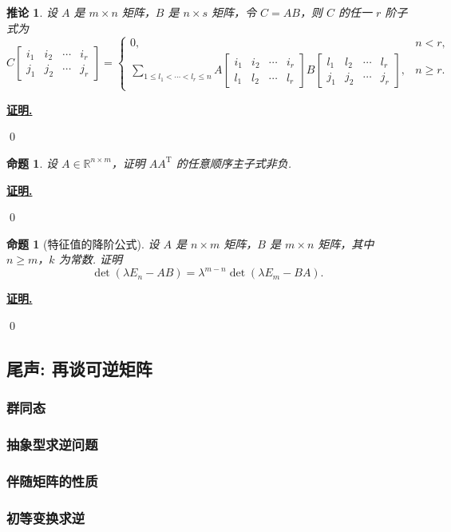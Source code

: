 \documentclass[10pt,openany]{article}
\theoremstyle{thmstyle} %
\theoremstyle{defstyle} %
\newtheorem{corollary}[theorem]{推论}
\theoremstyle{prostyle} %
\newtheorem{proposition}[theorem]{命题}
\theoremstyle{exastyle}
\theoremstyle{remstyle}
\renewenvironment{proof}[1][证明]{\par\underline{\textbf{#1.}} \;\fangsong}{\qed\par}
\newcommand{\T}{^{\text{T}}}
\newcommand{\R}{\mathbb{R}}
\newcommand{\nm}{^{n \times m}}
\begin{document}
\begin{corollary}
	\quad 设 \( A \) 是 \( m \times n \) 矩阵，\( B \) 是 \( n \times s \) 矩阵，令 \( C = AB \)，则 \( C \) 的任一 \( r \) 阶子式为
	\[
	C\begin{bmatrix}
		i_1 & i_2 & \cdots & i_r \\
		j_1 & j_2 & \cdots & j_r
	\end{bmatrix}
	=
	\left\{
	\begin{array}{lr}
		0, & n < r, \\
		\displaystyle \sum_{1 \le l_1 < \cdots < l_r \le n}
		A\begin{bmatrix}
			i_1 & i_2 & \cdots & i_r \\
			l_1 & l_2 & \cdots & l_r
		\end{bmatrix}
		B\begin{bmatrix}
			l_1 & l_2 & \cdots & l_r \\
			j_1 & j_2 & \cdots & j_r
		\end{bmatrix}, & n \ge r.
	\end{array}
	\right.
	\]
\end{corollary}

\begin{proof}
	
\end{proof}


\begin{proposition}
	设 \( A \in \R\nm \)，证明 \( AA\T \) 的任意顺序主子式非负.
\end{proposition}

\begin{proof}
	
\end{proof}


\begin{proposition}[特征值的降阶公式]
	设 \( A \) 是 \( n \times m \) 矩阵，\( B \) 是 \( m \times n \) 矩阵，其中 \( n \geq m \)，\( k \) 为常数. 证明
	\[ \det(\lambda E_n - AB)= \lambda^{m-n} \det(\lambda E_m - BA). \]
\end{proposition}

\begin{proof}
	
\end{proof}


\subsection{尾声: 再谈可逆矩阵}

\subsubsection{群同态}

\subsubsection{抽象型求逆问题}

\subsubsection{伴随矩阵的性质}

\subsubsection{初等变换求逆}
\end{document}
